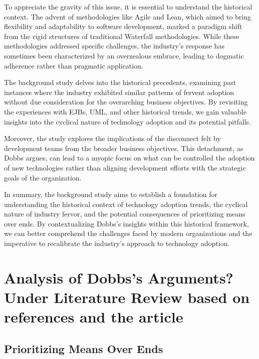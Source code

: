 \documentclass[a4Paper]{article}
\begin{document}
To appreciate the gravity of this issue, it is essential to understand the historical context. The advent of methodologies like Agile and Lean, which aimed to bring flexibility and adaptability to software development, marked a paradigm shift from the rigid structures of traditional Waterfall methodologies. While these methodologies addressed specific challenges, the industry's response has sometimes been characterized by an overzealous embrace, leading to dogmatic adherence rather than pragmatic application.

The background study delves into the historical precedents, examining past instances where the industry exhibited similar patterns of fervent adoption without due consideration for the overarching business objectives. By revisiting the experiences with EJBs, UML, and other historical trends, we gain valuable insights into the cyclical nature of technology adoption and its potential pitfalls.

Moreover, the study explores the implications of the disconnect felt by development teams from the broader business objectives. This detachment, as Dobbs argues, can lead to a myopic focus on what can be controlled the adoption of new technologies rather than aligning development efforts with the strategic goals of the organization.

In summary, the background study aims to establish a foundation for understanding the historical context of technology adoption trends, the cyclical nature of industry fervor, and the potential consequences of prioritizing means over ends. By contextualizing Dobbs's insights within this historical framework, we can better comprehend the challenges faced by modern organizations and the imperative to recalibrate the industry's approach to technology adoption.
\pagebreak

\section*{Analysis of Dobbs's Arguments? Under Literature Review based on references and the article}
\subsection*{Prioritizing Means Over Ends}
\end{document}
